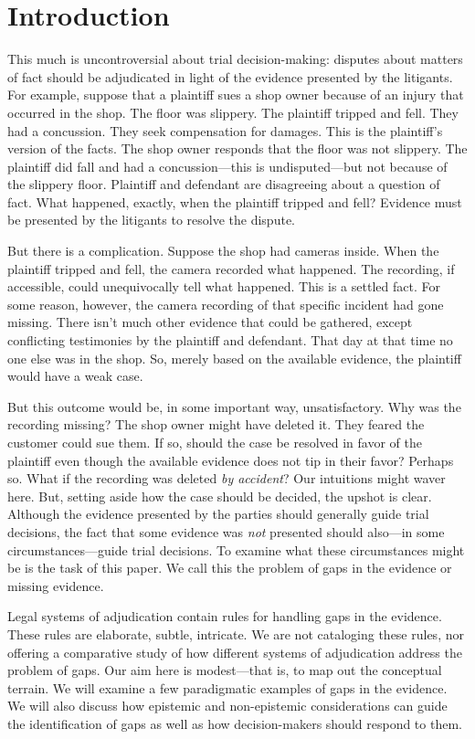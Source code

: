 \documentclass[
  10pt,
  dvipsnames,enabledeprecatedfontcommands]{scrartcl}
\begin{document}
\hypertarget{introduction}{%
\section{Introduction}\label{introduction}}

This much is uncontroversial about trial decision-making: disputes about
matters of fact should be adjudicated in light of the evidence presented
by the litigants. For example, suppose that a plaintiff sues a shop
owner because of an injury that occurred in the shop. The floor was
slippery. The plaintiff tripped and fell. They had a concussion. They
seek compensation for damages. This is the plaintiff's version of the
facts. The shop owner responds that the floor was not slippery. The
plaintiff did fall and had a concussion---this is undisputed---but not
because of the slippery floor. Plaintiff and defendant are disagreeing
about a question of fact. What happened, exactly, when the plaintiff
tripped and fell? Evidence must be presented by the litigants to resolve
the dispute.

But there is a complication. Suppose the shop had cameras inside. When
the plaintiff tripped and fell, the camera recorded what happened. The
recording, if accessible, could unequivocally tell what happened. This
is a settled fact. For some reason, however, the camera recording of
that specific incident had gone missing. There isn't much other evidence
that could be gathered, except conflicting testimonies by the plaintiff
and defendant. That day at that time no one else was in the shop. So,
merely based on the available evidence, the plaintiff would have a weak
case.

But this outcome would be, in some important way, unsatisfactory. Why
was the recording missing? The shop owner might have deleted it. They
feared the customer could sue them. If so, should the case be resolved
in favor of the plaintiff even though the available evidence does not
tip in their favor? Perhaps so. What if the recording was deleted
\emph{by accident}? Our intuitions might waver here. But, setting aside
how the case should be decided, the upshot is clear. Although the
evidence presented by the parties should generally guide trial
decisions, the fact that some evidence was \textit{not} presented should
also---in some circumstances---guide trial decisions. To examine what
these circumstances might be is the task of this paper. We call this the
problem of gaps in the evidence or missing evidence.

Legal systems of adjudication contain rules for handling gaps in the
evidence. These rules are elaborate, subtle, intricate. We are not
cataloging these rules, nor offering a comparative study of how
different systems of adjudication address the problem of gaps. Our aim
here is modest---that is, to map out the conceptual terrain. We will
examine a few paradigmatic examples of gaps in the evidence. We will
also discuss how epistemic and non-epistemic considerations can guide
the identification of gaps as well as how decision-makers should respond
to them.
\end{document}

